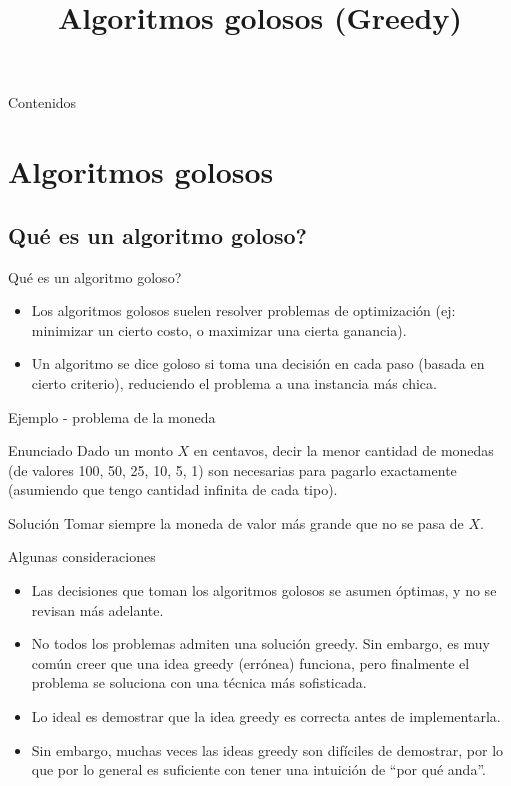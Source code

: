 \documentclass{beamer}
\title[Greedy]{Algoritmos golosos (Greedy)}
\begin{document}
\begin{frame}
  \titlepage
\end{frame}

\begin{frame}{Contenidos}
  \tableofcontents
\end{frame}

\section{Algoritmos golosos}
\subsection{Qu\'e es un algoritmo goloso?}
\begin{frame}{Qu\'e es un algoritmo goloso?}
\begin{itemize}
\item
Los algoritmos golosos suelen resolver problemas de optimizaci\'on (ej: minimizar un cierto costo, o maximizar una cierta ganancia).
\item
Un algoritmo se dice goloso si toma una decisi\'on en cada paso (basada en cierto criterio), reduciendo el problema a una instancia m\'as chica.
\end{itemize}
\end{frame}
\begin{frame}{Ejemplo - problema de la moneda}
\begin{block}{Enunciado}
Dado un monto $X$ en centavos, decir la menor cantidad de monedas (de valores 100, 50, 25, 10, 5, 1) son necesarias para pagarlo exactamente (asumiendo que tengo cantidad infinita de cada tipo).
\end{block}
\pause
\begin{block}{Soluci\'on}
Tomar siempre la moneda de valor m\'as grande que no se pasa de $X$.
\end{block}
\end{frame}
\begin{frame}{Algunas consideraciones}
\begin{itemize}
\item
Las decisiones que toman los algoritmos golosos se asumen \'optimas, y no se revisan m\'as adelante.
\item
No todos los problemas admiten una soluci\'on greedy. Sin embargo, es muy com\'un creer que una idea greedy (err\'onea) funciona, pero finalmente el problema se soluciona con una t\'ecnica m\'as sofisticada.
\item
Lo ideal es demostrar que la idea greedy es correcta antes de implementarla.
\item
Sin embargo, muchas veces las ideas greedy son dif\'iciles de demostrar,  por lo que por lo general es suficiente con tener una intuici\'on de ``por qu\'e anda''.
\end{itemize}
\end{frame}
\end{document}
